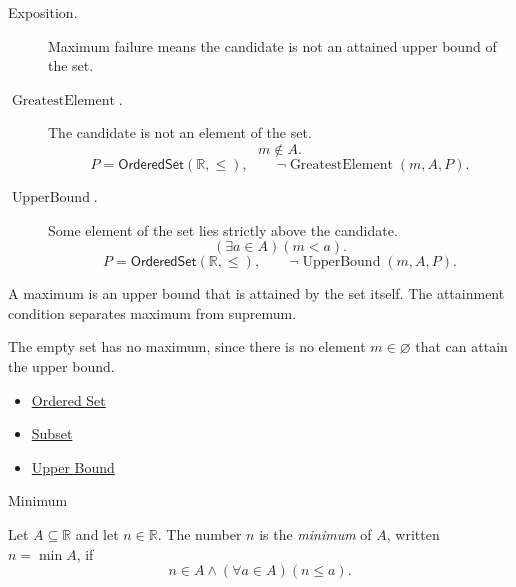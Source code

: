 \begin{remark*}
\begin{description}
  \item[Exposition.]
  Maximum failure means the candidate is not an attained upper bound of
  the set.

  \item[\(\operatorname{GreatestElement}.\)]
  The candidate is not an element of the set.
  \[
    m\notin A.
  \]
  \[
    P=\mathsf{OrderedSet}(\mathbb{R},\leq),\qquad
    \neg\operatorname{GreatestElement}(m,A,P).
  \]

  \item[\(\operatorname{UpperBound}.\)]
  Some element of the set lies strictly above the candidate.
  \[
    (\exists a\in A)(m<a).
  \]
  \[
    P=\mathsf{OrderedSet}(\mathbb{R},\leq),\qquad
    \neg\operatorname{UpperBound}(m,A,P).
  \]
\end{description}
\end{remark*}

\begin{remark*}[Interpretation]
A maximum is an upper bound that is attained by the set itself.  The
attainment condition separates maximum from supremum.
\end{remark*}

\begin{remark*}[Exposition]
The empty set has no maximum, since there is no element $m\in\varnothing$
that can attain the upper bound.
\end{remark*}

\begin{dependencies}
\begin{itemize}
  \item \hyperref[def:ordered-set]{Ordered Set}
  \item \hyperref[def:subset]{Subset}
  \item \hyperref[def:real-upper-bound]{Upper Bound}
\end{itemize}
\end{dependencies}

\begin{definitionbox}{Minimum}
\begin{definition}[Minimum]
\label{def:minimum}
Let $A\subseteq\mathbb{R}$ and let $n\in\mathbb{R}$. The number $n$ is the
\emph{minimum} of $A$, written $n=\min A$, if
\[
  n\in A
  \land
  (\forall a\in A)(n\leq a).
\]
\end{definition}
\end{definitionbox}

